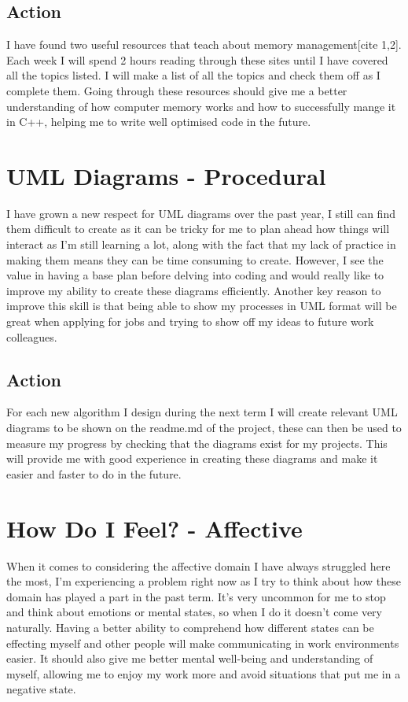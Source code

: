 \documentclass{scrartcl}
\begin{document}
\subsection{Action}
I have found two useful resources that teach about memory management[cite 1,2]. Each week I will spend 2 hours reading through these sites until I have covered all the topics listed. I will make a list of all the topics and check them off as I complete them. Going through these resources should give me a better understanding of how computer memory works and how to successfully mange it in C++, helping me to write well optimised code in the future.

\section{UML Diagrams - Procedural}
I have grown a new respect for UML diagrams over the past year, I still can find them difficult to create as it can be tricky for me to plan ahead how things will interact as I'm still learning a lot, along with the fact that my lack of practice in making them means they can be time consuming to create. However, I see the value in having a base plan before delving into coding and would really like to improve my ability to create these diagrams efficiently. Another key reason to improve this skill is that being able to show my processes in UML format will be great when applying for jobs and trying to show off my ideas to future work colleagues.
\subsection{Action}
For each new algorithm I design during the next term I will create relevant UML diagrams to be shown on the readme.md of the project, these can then be used to measure my progress by checking that the diagrams exist for my projects. This will provide me with good experience in creating these diagrams and make it easier and faster to do in the future.

\section{How Do I Feel? - Affective}
When it comes to considering the affective domain I have always struggled here the most, I'm experiencing a problem right now as I try to think about how these domain has played a part in the past term. It's very uncommon for me to stop and think about emotions or mental states, so when I do it doesn't come very naturally. Having a better ability to comprehend how different states can be effecting myself and other people will make communicating in work environments easier. It should also give me better mental well-being and understanding of myself, allowing me to enjoy my work more and avoid situations that put me in a negative state.
\end{document}
